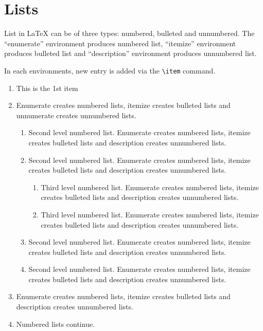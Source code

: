 \documentclass{sysbio}%
\begin{document}
\section{Lists}\label{sec9}

List in \LaTeX{} can be of three types: numbered, bulleted and unnumbered. The ``enumerate'' environment produces numbered list, ``itemize'' environment produces bulleted list and ``description'' environment produces unnumbered list.

In each environments, new entry is added via the \verb+\item+ command.

\begin{enumerate}
\item This is the 1st item

\item Enumerate creates numbered lists, itemize creates bulleted lists and
unnumerate creates unnumbered lists.

\begin{enumerate}
\item Second level numbered list. Enumerate creates numbered lists, itemize creates bulleted lists and
description creates unnumbered lists.

\item Second level numbered list. Enumerate creates numbered lists, itemize creates bulleted lists and
description creates unnumbered lists.

\begin{enumerate}
\item Third level numbered list. Enumerate creates numbered lists, itemize creates bulleted lists and
description creates unnumbered lists.

\item Third level numbered list. Enumerate creates numbered lists, itemize creates bulleted lists and
description creates unnumbered lists.
\end{enumerate}

\item Second level numbered list. Enumerate creates numbered lists, itemize creates bulleted lists and
description creates unnumbered lists.

\item Second level numbered list. Enumerate creates numbered lists, itemize creates bulleted lists and
description creates unnumbered lists.
\end{enumerate}

\item Enumerate creates numbered lists, itemize creates bulleted lists and
description creates unnumbered lists.

\item Numbered lists continue.
\end{enumerate}
\end{document}
